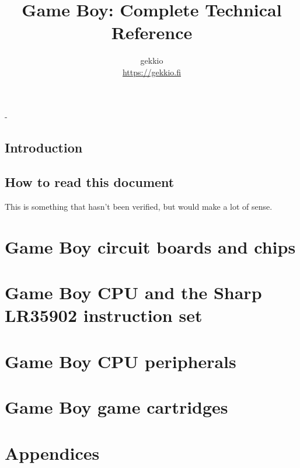 \documentclass[a4paper, draft, oneside]{memoir}
\title{Game Boy: Complete Technical Reference}
\author{gekkio\\ \url{https://gekkio.fi}}
\begin{document}
\hypersetup{pageanchor=false}

\begin{titlingpage}
  \calccentering{\unitlength}
  \setlength{\droptitle}{80pt}
  \begin{adjustwidth*}{\unitlength}{-\unitlength}
    \maketitle
  \end{adjustwidth*}
\end{titlingpage}

\hypersetup{pageanchor=true}

\tableofcontents

\chapter*{Introduction}

\chapter*{How to read this document}

\begin{speculation}
  This is something that hasn't been verified, but would make a lot of sense.
\end{speculation}

\part{Game Boy circuit boards and chips}




\part{Game Boy CPU and the Sharp LR35902 instruction set}

\part{Game Boy CPU peripherals}

\part{Game Boy game cartridges}

\part*{Appendices}

\begin{appendices}


\end{appendices}


\end{document}
